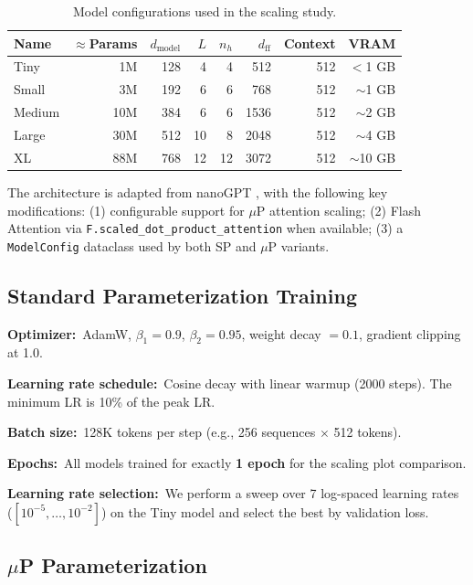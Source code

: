 \documentclass[11pt,letterpaper]{article}
\begin{document}
\begin{table}[H]
\centering
\caption{Model configurations used in the scaling study.}
\label{tab:models}
\begin{tabular}{lrrrrrrr}
\toprule
\textbf{Name} & $\approx$\textbf{Params} & $d_{\text{model}}$ & $L$ & $n_h$ & $d_{\text{ff}}$ & \textbf{Context} & \textbf{VRAM} \\
\midrule
Tiny   & 1M  & 128 & 4  & 4  & 512  & 512 & $<$1 GB \\
Small  & 3M  & 192 & 6  & 6  & 768  & 512 & $\sim$1 GB \\
Medium & 10M & 384 & 6  & 6  & 1536 & 512 & $\sim$2 GB \\
Large  & 30M & 512 & 10 & 8  & 2048 & 512 & $\sim$4 GB \\
XL     & 88M & 768 & 12 & 12 & 3072 & 512 & $\sim$10 GB \\
\bottomrule
\end{tabular}
\end{table}

The architecture is adapted from nanoGPT \cite{nanogpt}, with the following key modifications:
(1) configurable support for $\mu$P attention scaling;
(2) Flash Attention via \texttt{F.scaled\_dot\_product\_attention} when available;
(3) a \texttt{ModelConfig} dataclass used by both SP and $\mu$P variants.

\subsection{Standard Parameterization Training}

\textbf{Optimizer:}~AdamW, $\beta_1=0.9$, $\beta_2=0.95$, weight decay $=0.1$, gradient
clipping at 1.0.

\textbf{Learning rate schedule:}~Cosine decay with linear warmup (2000 steps).
The minimum LR is 10\% of the peak LR.

\textbf{Batch size:}~128K tokens per step (e.g., 256 sequences $\times$ 512 tokens).

\textbf{Epochs:}~All models trained for exactly \textbf{1 epoch} for the scaling plot comparison.

\textbf{Learning rate selection:}~We perform a sweep over 7 log-spaced learning rates
($[10^{-5}, \ldots, 10^{-2}]$) on the Tiny model and select the best by validation loss.

\subsection{$\mu$P Parameterization}
\end{document}
